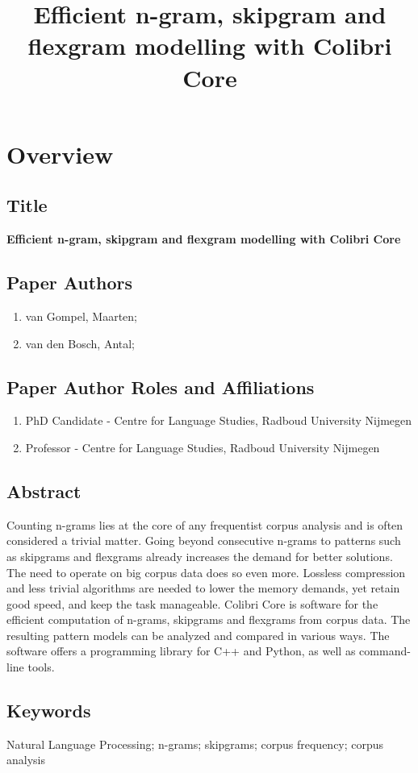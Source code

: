 \documentclass[a4paper,12pt]{article}
\title{Efficient n-gram, skipgram and flexgram modelling with Colibri Core}
\begin{document}
\section{Overview}

\subsection{Title}
\textbf{Efficient n-gram, skipgram and flexgram modelling with Colibri Core}

\subsection{Paper Authors}
\begin{enumerate}
    \item van Gompel, Maarten;
    \item van den Bosch, Antal;
\end{enumerate}

\subsection{Paper Author Roles and Affiliations}
\begin{enumerate}
    \item PhD Candidate - Centre for Language Studies, Radboud University Nijmegen
    \item Professor - Centre for Language Studies, Radboud University Nijmegen
\end{enumerate}

\subsection{Abstract}

Counting n-grams lies at the core of any frequentist corpus analysis and is
often considered a trivial matter. Going beyond consecutive n-grams to patterns
such as skipgrams and flexgrams already increases the demand for better
solutions. The need to operate on big corpus data does so even more.  Lossless
compression and less trivial algorithms are needed to lower the memory demands,
yet retain good speed, and keep the task manageable. Colibri Core is software
for the efficient computation of n-grams, skipgrams and flexgrams from corpus
data. The resulting pattern models can be analyzed and compared in various
ways. The software offers a programming library for C++ and
Python, as well as command-line tools.

\subsection{Keywords}
Natural Language Processing; n-grams; skipgrams; corpus frequency; corpus analysis
\end{document}
